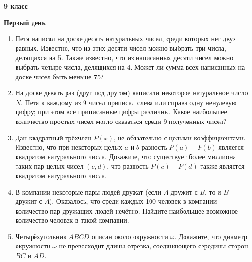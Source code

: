 \documentclass{article}
\begin{document}
\large
	
\begin{center}
	\LARGE\textbf{9 класс}
\end{center}
\begin{center}
	\large\textbf{Первый день}
\end{center}


\begin{enumerate}[label*=9.{\arabic{enumi}}]
\setcounter{enumi}{0}

\item Петя написал на доске десять натуральных чисел, среди которых нет двух равных. Известно, что из этих десяти чисел можно выбрать три числа, делящихся на 5. Также известно, что из написанных десяти чисел можно выбрать четыре числа, делящихся на 4. Может ли сумма всех написанных на доске чисел быть меньше 75?

\item На доске девять раз (друг под другом) написали некоторое натуральное число $N$. Петя к каждому из 9 чисел приписал слева или справа одну ненулевую цифру; при этом все приписанные цифры различны. Какое наибольшее количество простых чисел могло оказаться среди 9 полученных чисел?

\item  Дан квадратный трёхчлен $P(x)$, не обязательно с целыми коэффициентами. Известно, что при некоторых целых $a$ и $b$ разность $P(a) - P(b)$ является квадратом натурального числа. Докажите, что существует более миллиона таких пар целых чисел $(c, d)$, что разность $P(c) - P(d)$ также является квадратом натурального числа.

\item  В компании некоторые пары людей дружат (если $A$ дружит с $B$, то и $B$ дружит с $A$). Оказалось, что среди каждых 100 человек в компании количество пар дружащих людей нечётно. Найдите наибольшее возможное количество человек в такой компании.

\item Четырёхугольник $ABCD$ описан около окружности $\omega$. Докажите, что диаметр окружности $\omega$ не превосходит длины отрезка, соединяющего середины сторон $BC$ и $AD$.

\end{enumerate}
\end{document}
